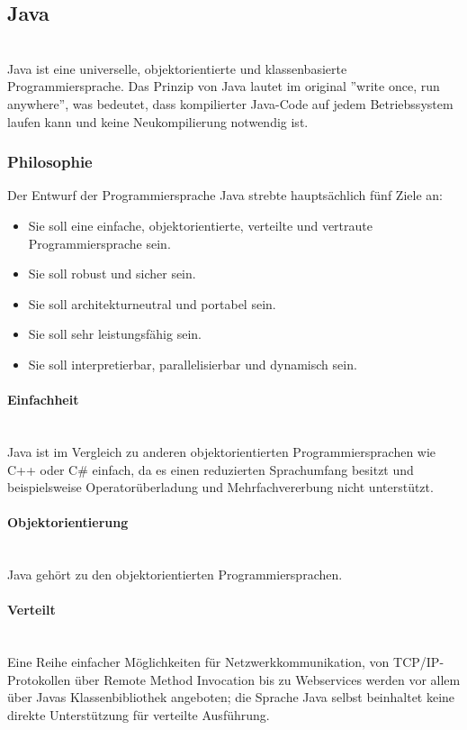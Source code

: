 \subsection{Java}\ \\
Java ist eine universelle, objektorientierte und klassenbasierte Programmiersprache. Das Prinzip von Java lautet im original ''write once, run anywhere'', was bedeutet, dass kompilierter Java-Code auf jedem Betriebssystem laufen kann und keine Neukompilierung notwendig ist.
\subsubsection{Philosophie}
Der Entwurf der Programmiersprache Java strebte hauptsächlich fünf Ziele an:

\begin{itemize}
	\item Sie soll eine einfache, objektorientierte, verteilte und vertraute Programmiersprache sein.
	\item Sie soll robust und sicher sein.
	\item Sie soll architekturneutral und portabel sein.
	\item Sie soll sehr leistungsfähig sein.
	\item Sie soll interpretierbar, parallelisierbar und dynamisch sein.
\end{itemize}
\noindent

\paragraph{Einfachheit}\ \\
Java ist im Vergleich zu anderen objektorientierten Programmiersprachen wie C++ oder C\# einfach, da es einen reduzierten Sprachumfang besitzt und beispielsweise Operatorüberladung und Mehrfachvererbung nicht unterstützt.

\paragraph{Objektorientierung}\ \\
Java gehört zu den objektorientierten Programmiersprachen.

\paragraph{Verteilt}\ \\
Eine Reihe einfacher Möglichkeiten für Netzwerkkommunikation, von TCP/IP-Protokollen über Remote Method Invocation bis zu Webservices werden vor allem über Javas Klassenbibliothek angeboten; die Sprache Java selbst beinhaltet keine direkte Unterstützung für verteilte Ausführung.

